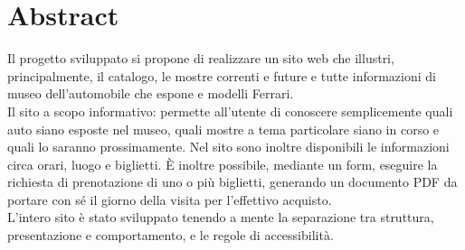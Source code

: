 \section{Abstract}
Il progetto sviluppato si propone di realizzare un sito web che illustri, principalmente, il catalogo, le mostre correnti e future e tutte informazioni di museo dell'automobile che espone e modelli Ferrari.\\
Il sito a scopo informativo: permette all'utente di conoscere semplicemente quali auto siano esposte nel museo, quali mostre a tema particolare siano in corso e quali lo saranno prossimamente. Nel sito sono inoltre disponibili le informazioni circa orari, luogo e biglietti. È inoltre possibile, mediante un form, eseguire la richiesta di prenotazione di uno o più biglietti, generando un documento PDF da portare con sé il giorno della visita per l'effettivo acquisto.\\
L'intero sito è stato sviluppato tenendo a mente la separazione tra struttura, presentazione e comportamento, e le regole di accessibilità.
